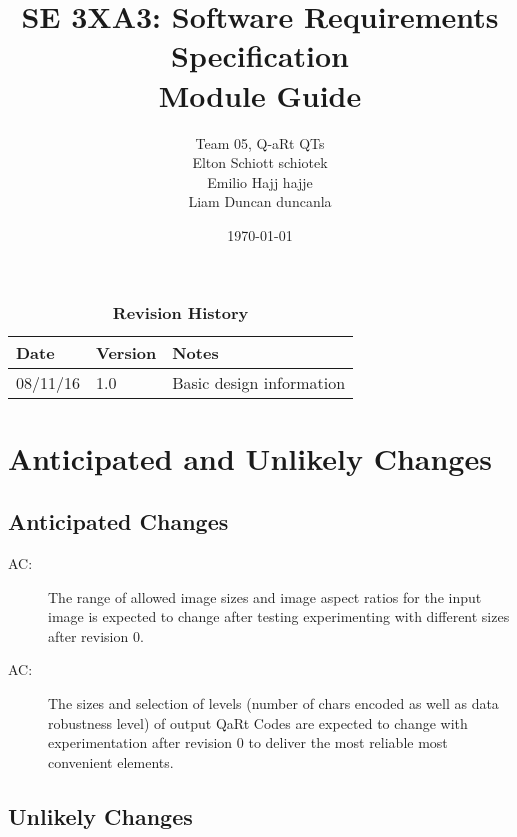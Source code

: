 \documentclass[12pt, titlepage]{article}
\title{SE 3XA3: Software Requirements Specification\\Module Guide}
\author{Team 05, Q-aRt QTs 
\\Elton Schiott schiotek 
\\Emilio Hajj hajje 
\\Liam Duncan duncanla
}
\date{\today}
\newcounter{acnum}
\newcommand{\actheacnum}{AC\theacnum}
\begin{document}
\maketitle

\tableofcontents
\listoftables
\listoffigures

\begin{table}[bp]
\caption{\bf Revision History}
\begin{tabularx}{\textwidth}{p{3cm}p{2cm}X}
\toprule {\bf Date} & {\bf Version} & {\bf Notes}\\
\midrule
08/11/16 & 1.0 & Basic design information\\
\bottomrule
\end{tabularx}
\end{table}

\newpage


\section{Anticipated and Unlikely Changes} \label{SecChange}


\subsection{Anticipated Changes} \label{SecAchange}


\begin{description}
\item[ \actheacnum \label{acInputImage}:] 
The range of allowed image sizes and image aspect ratios for the input image is expected to change after testing experimenting with different sizes after revision 0.

\item[ \actheacnum \label{QRCodeSizes}:] 
The sizes and selection of levels (number of chars encoded as well as data robustness level) of output QaRt Codes are expected to change with experimentation after revision 0 to deliver the most reliable most convenient elements.

\end{description}

\subsection{Unlikely Changes} \label{SecUchange}
\end{document}
